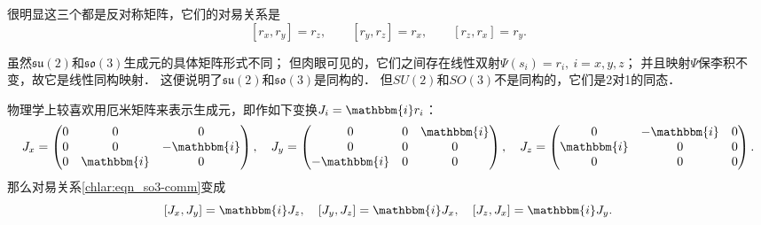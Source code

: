 很明显这三个都是反对称矩阵，它们的对易关系是
\begin{equation}\label{chlar:eqn_so3-comm}
    [r_x, r_y]=r_z, \qquad
    [r_y, r_z]=r_x, \qquad
    [r_z, r_x]=r_y .
\end{equation}

虽然$\mathfrak{su}(2)$和$\mathfrak{so}(3)$生成元的具体矩阵形式不同；
但肉眼可见的，它们之间存在线性双射$\Psi(s_i)=r_i,\  i=x,y,z$；
并且映射$\Psi$保李积不变，故它是线性同构映射．
这便说明了$\mathfrak{su}(2)$和$\mathfrak{so}(3)$是同构的．
但$SU(2)$和$SO(3)$不是同构的，它们是2对1的同态．


物理学上较喜欢用厄米矩阵来表示生成元，即作如下变换$J_i = \mathbbm{i} r_i$：
\begin{equation}\label{chlar:eqn_so3-J}
    J_x=\begin{pmatrix}
        0 & 0 & 0 \\
        0& 0 & -\mathbbm{i} \\
        0 & \mathbbm{i} & 0
    \end{pmatrix},\quad
    J_y=\begin{pmatrix}
        0 & 0 & \mathbbm{i} \\
        0 & 0 & 0 \\
        -\mathbbm{i} & 0 & 0
    \end{pmatrix},\quad
    J_z=\begin{pmatrix}
        0 & -\mathbbm{i} & 0 \\
        \mathbbm{i} & 0 & 0 \\
        0 & 0 & 0
    \end{pmatrix} .
\end{equation}
那么对易关系\eqref{chlar:eqn_so3-comm}变成
\begin{equation}\label{chlar:eqn_so3-comm-J}
    [J_x, J_y] = \mathbbm{i} J_z,\quad
    [J_y, J_z] = \mathbbm{i} J_x,\quad
    [J_z, J_x] = \mathbbm{i} J_y.
\end{equation}

